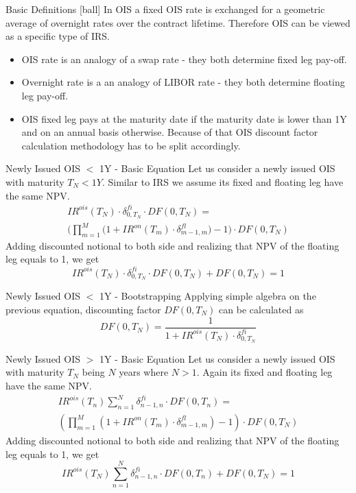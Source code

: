\documentclass{beamer}
\begin{document}
\begin{frame}{Basic Definitions}
[ball]
In OIS a fixed OIS rate is exchanged for a geometric average of overnight rates over the contract lifetime. Therefore OIS can be viewed as a specific type of IRS.
\begin{itemize}
\item OIS rate is an analogy of a swap rate - they both determine fixed leg pay-off.
\item Overnight rate is a an analogy of LIBOR rate - they both determine floating leg pay-off.
\item OIS fixed leg pays at the maturity date if the maturity date is lower than 1Y and on an annual basis otherwise. Because of that OIS discount factor calculation methodology has to be split accordingly.
\end{itemize}
\end{frame}

\begin{frame}{Newly Issued OIS $<$ 1Y - Basic Equation}
Let us consider a newly issued OIS with maturity $T_N < 1Y$. Similar to IRS we assume its fixed and floating leg have the same NPV.
\begin{multline*}
IR^{ois}(T_N) \cdot \delta_{0, T_N}^{fi} \cdot DF(0, T_N) =\\
\bigg(\prod_{m = 1} ^ M \big(1 + IR^{on}(T_m) \cdot \delta_{m - 1, m}^{fl}\big) - 1 \bigg) \cdot DF(0, T_N) 
\end{multline*}
Adding discounted notional to both side and realizing that NPV of the floating leg equals to 1, we get
\begin{equation*}
IR^{ois}(T_N) \cdot \delta_{0, T_N}^{fi} \cdot DF(0, T_N) + DF(0, T_N) = 1
\end{equation*}
\end{frame}

\begin{frame}{Newly Issued OIS $<$ 1Y - Bootstrapping}
Applying simple algebra on the previous equation, discounting factor $DF(0, T_N)$ can be calculated as
\begin{equation*}
DF(0, T_N) = \frac{1}{1 + IR^{ois}(T_N) \cdot \delta_{0, T_N}^{fi}}
\end{equation*}
\end{frame}

\begin{frame}{Newly Issued OIS $>$ 1Y - Basic Equation}
Let us consider a newly issued OIS with maturity $T_N$ being $N$ years where $N > 1$. Again its fixed and floating leg have the same NPV.
\begin{multline*}
IR^{ois}(T_n) \sum_{n = 1}^N \delta_{n - 1, n}^{fi} \cdot DF(0, T_n) =\\
\left(\prod_{m = 1} ^ M \left(1 + IR^{on}(T_m) \cdot \delta_{m - 1, m}^{fl}\right) - 1 \right) \cdot DF(0, T_N) 
\end{multline*}
Adding discounted notional to both side and realizing that NPV of the floating leg equals to 1, we get
\begin{equation*}
IR^{ois}(T_N) \sum_{n = 1}^N \delta_{n - 1, n}^{fi} \cdot DF(0, T_n) + DF(0, T_N) = 1
\end{equation*}
\end{frame}
\end{document}
